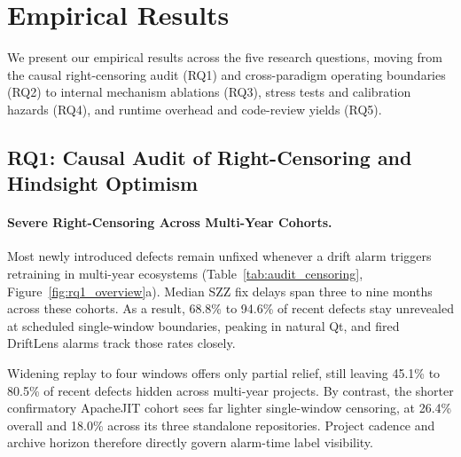 \documentclass[pdflatex,sn-basic]{sn-jnl}
\theoremstyle{definition}
\theoremstyle{plain}
\begin{document}
\section{Empirical Results}
\label{sec:results}

We present our empirical results across the five research questions, moving from the causal right-censoring audit (RQ1) and cross-paradigm operating boundaries (RQ2) to internal mechanism ablations (RQ3), stress tests and calibration hazards (RQ4), and runtime overhead and code-review yields (RQ5).

\subsection{RQ1: Causal Audit of Right-Censoring and Hindsight Optimism}
\label{sec:rq1}

\paragraph{Severe Right-Censoring Across Multi-Year Cohorts.}
Most newly introduced defects remain unfixed whenever a drift alarm triggers retraining in multi-year ecosystems (Table~\ref{tab:audit_censoring}, Figure~\ref{fig:rq1_overview}a). Median SZZ fix delays span three to nine months across these cohorts. As a result, 68.8\% to 94.6\% of recent defects stay unrevealed at scheduled single-window boundaries, peaking in natural Qt, and fired DriftLens alarms track those rates closely.

Widening replay to four windows offers only partial relief, still leaving 45.1\% to 80.5\% of recent defects hidden across multi-year projects. By contrast, the shorter confirmatory ApacheJIT cohort sees far lighter single-window censoring, at 26.4\% overall and 18.0\% across its three standalone repositories. Project cadence and archive horizon therefore directly govern alarm-time label visibility.
\end{document}
